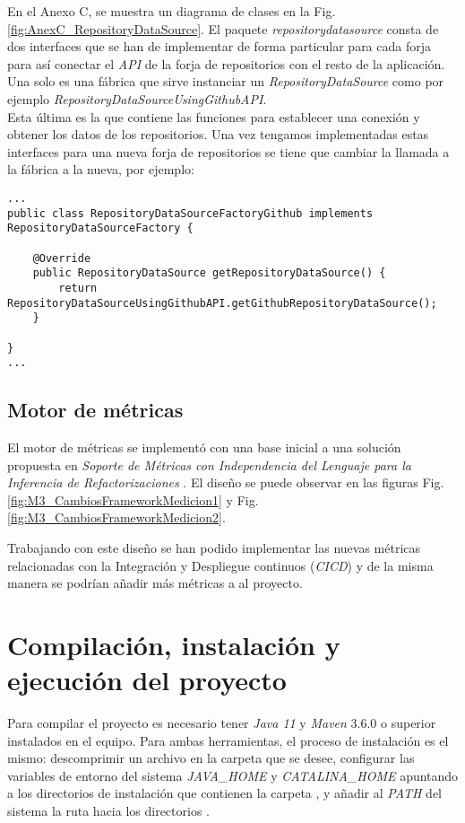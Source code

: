 En el Anexo C, se muestra un diagrama de clases en la Fig. \ref{fig:AnexC_RepositoryDataSource}. El paquete \textit{repositorydatasource} consta de dos interfaces que se han de implementar de forma particular para cada forja para así conectar el \textit{API} de la forja de repositorios con el resto de la aplicación. \\
Una solo es una fábrica que sirve instanciar un \textit{RepositoryDataSource} como por ejemplo \textit{RepositoryDataSourceUsingGithubAPI}.\\ Esta última es la que contiene las funciones para establecer una conexión y obtener los datos de los repositorios. Una vez tengamos implementadas estas interfaces para una nueva forja de repositorios se tiene que cambiar la llamada a la fábrica a la nueva, por ejemplo:

\begin{minipage}{\linewidth}
\tiny \begin{verbatim}
...
public class RepositoryDataSourceFactoryGithub implements RepositoryDataSourceFactory {

	@Override
	public RepositoryDataSource getRepositoryDataSource() {
		return RepositoryDataSourceUsingGithubAPI.getGithubRepositoryDataSource();
	}

}
...
\end{verbatim}
\end{minipage}	

\subsection{Motor de métricas}
El motor de métricas se implementó con una base inicial a una solución propuesta en \textit{Soporte de Métricas con Independencia del Lenguaje para la Inferencia de Refactorizaciones} \cite{marticorena_sanchez_soporte_2005}. El diseño se puede observar en las figuras Fig. \ref{fig:M3_CambiosFrameworkMedicion1} y Fig. \ref{fig:M3_CambiosFrameworkMedicion2}.

Trabajando con este diseño se han podido implementar las nuevas métricas relacionadas con la Integración y Despliegue continuos (\textit{CICD}) y de la misma manera se podrían añadir más métricas a al proyecto.

\section{Compilación, instalación y ejecución del proyecto}
Para compilar el proyecto es necesario tener \textit{Java 11} y \textit{Maven} 3.6.0 o superior instalados en el equipo. Para ambas herramientas, el proceso de instalación es el mismo: descomprimir un archivo en la carpeta que se desee, configurar las variables de entorno del sistema \textit{JAVA\_HOME} y  \textit{CATALINA\_HOME} apuntando a los directorios de instalación que contienen la carpeta , y añadir al \textit{PATH} del sistema la ruta hacia los directorios .\\

